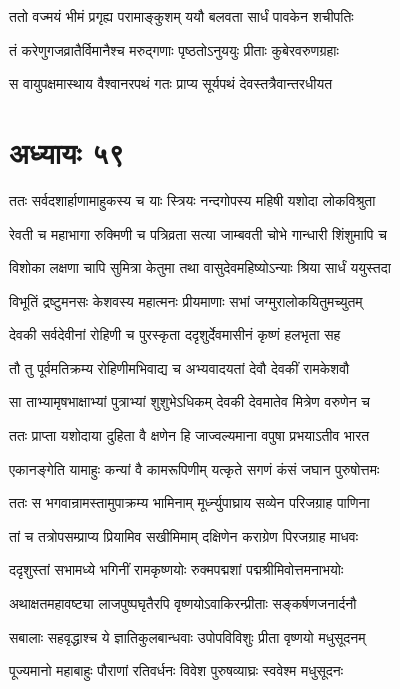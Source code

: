 \twolineshloka
{ततो वज्मयं भीमं प्रगृह्य परामाङ्कुशम्}
{ययौ बलवता सार्धं पावकेन शचीपतिः}


\twolineshloka
{तं करेणुगजव्रातैर्विमानैश्च मरुद्गणाः}
{पृष्ठतोऽनुययुः प्रीताः कुबेरवरुणग्रहाः}


\twolineshloka
{स वायुपक्षमास्थाय वैश्वानरपथं गतः}
{प्राप्य सूर्यपथं देवस्तत्रैवान्तरधीयत}


\chapter{अध्यायः ५९}
\twolineshloka
{ततः सर्वदशार्हाणामाहुकस्य च याः स्त्रियः}
{नन्दगोपस्य महिषी यशोदा लोकविश्रुता}


\twolineshloka
{रेवती च महाभागा रुक्मिणी च पत्रिव्रता}
{सत्या जाम्बवती चोभे गान्धारी शिंशुमापि च}


\twolineshloka
{विशोका लक्षणा चापि सुमित्रा केतुमा तथा}
{वासुदेवमहिष्योऽन्याः श्रिया सार्धं ययुस्तदा}


\twolineshloka
{विभूतिं द्रष्टुमनसः केशवस्य महात्मनः}
{प्रीयमाणाः सभां जग्मुरालोकयितुमच्युतम्}


\twolineshloka
{देवकी सर्वदेवीनां रोहिणी च पुरस्कृता}
{ददृशुर्देवमासीनं कृष्णं हलभृता सह}


\twolineshloka
{तौ तु पूर्वमतिक्रम्य रोहिणीमभिवाद्य च}
{अभ्यवादयतां देवौ देवकीं रामकेशवौ}


\twolineshloka
{सा ताभ्यामृषभाक्षाभ्यां पुत्राभ्यां शुशुभेऽधिकम्}
{देवकी देवमातेव मित्रेण वरुणेन च}


\twolineshloka
{ततः प्राप्ता यशोदाया दुहिता वै क्षणेन हि}
{जाज्वल्यमाना वपुषा प्रभयाऽतीव भारत}


\twolineshloka
{एकानङ्गेति यामाहुः कन्यां वै कामरूपिणीम्}
{यत्कृते सगणं कंसं जघान पुरुषोत्तमः}


\twolineshloka
{ततः स भगवान्रामस्तामुपाक्रम्य भामिनाम्}
{मूर्ध्न्युपाघ्राय सव्येन परिजग्राह पाणिना}


\twolineshloka
{तां च तत्रोपसम्प्राप्य प्रियामिव सखीमिमाम्}
{दक्षिणेन कराग्रेण पिरजग्राह माधवः}


\twolineshloka
{ददृशुस्तां सभामध्ये भगिनीं रामकृष्णयोः}
{रुक्मपद्मशां पद्मश्रीमिवोत्तमनाभयोः}


\twolineshloka
{अथाक्षतमहावष्ट्या लाजपुष्पघृतैरपि}
{वृष्णयोऽवाकिरन्प्रीताः सङ्कर्षणजनार्दनौ}


\twolineshloka
{सबालाः सहवृद्धाश्च ये ज्ञातिकुलबान्धवाः}
{उपोपविविशुः प्रीता वृष्णयो मधुसूदनम्}


\twolineshloka
{पूज्यमानो महाबाहुः पौराणां रतिवर्धनः}
{विवेश पुरुषव्याघ्रः स्ववेश्म मधुसूदनः}


